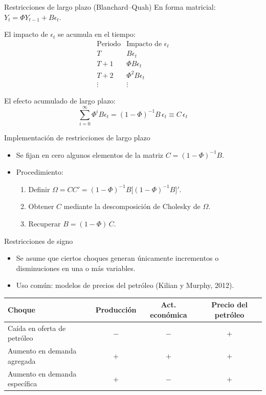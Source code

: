 \documentclass[11pt]{beamer}
\begin{document}
\begin{frame}{Restricciones de largo plazo (Blanchard--Quah)}
En forma matricial: $Y_t = \Phi Y_{t-1} + B\epsilon_t$.

El impacto de $\epsilon_t$ se acumula en el tiempo:
\[
\begin{array}{c|c}
\text{Periodo} & \text{Impacto de } \epsilon_t \\
\hline
T & B\epsilon_t \\
T+1 & \Phi B \epsilon_t \\
T+2 & \Phi^2 B \epsilon_t \\
\vdots & \vdots
\end{array}
\]

El efecto acumulado de largo plazo:
\[
\sum_{i=0}^{\infty}\Phi^i B \epsilon_t = (1-\Phi)^{-1} B\, \epsilon_t \equiv C\,\epsilon_t
\]
\end{frame}

\begin{frame}{Implementación de restricciones de largo plazo}
\begin{itemize}
    \item Se fijan en cero algunos elementos de la matriz $C = (1-\Phi)^{-1}B$.
    \item Procedimiento:
    \begin{enumerate}
        \item Definir $\Omega = CC' = (1-\Phi)^{-1}B\big[(1-\Phi)^{-1}B\big]'$.
        \item Obtener $C$ mediante la descomposición de Cholesky de $\Omega$.
        \item Recuperar $B = (1-\Phi)\,C$.
    \end{enumerate}
\end{itemize}
\end{frame}

\begin{frame}{Restricciones de signo}
\begin{itemize}
    \item Se asume que ciertos choques generan únicamente incrementos o disminuciones en una o más variables.
    \item Uso común: modelos de precios del petróleo (Kilian y Murphy, 2012).
\end{itemize}

\small
\begin{tabular}{lccc}
\toprule
\textbf{Choque} & \textbf{Producción} & \textbf{Act. económica} & \textbf{Precio del petróleo} \\
\midrule
Caída en oferta de petróleo & $-$ & $-$ & $+$ \\
Aumento en demanda agregada & $+$ & $+$ & $+$ \\
Aumento en demanda específica & $+$ & $-$ & $+$ \\
\bottomrule
\end{tabular}
\end{frame}
\end{document}
